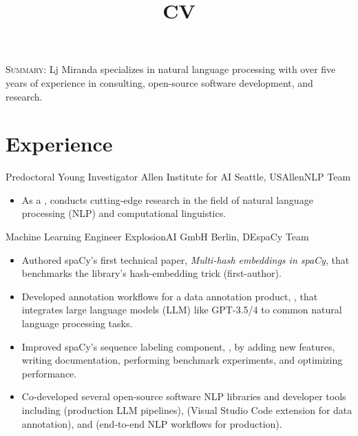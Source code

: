 \documentclass[12pt,a4paper]{moderncv}
\title{CV}
\begin{document}
\maketitle

\textsc{Summary}: Lj Miranda specializes in natural language processing with over five years of
experience in consulting, open-source software development, and research. 

\section{Experience}

{Predoctoral Young Investigator}
{Allen Institute for AI}
{Seattle, US}{AllenNLP Team}
{
    \begin{itemize}
        \item As a {\color{blue}}, conducts
        cutting-edge research in the field of natural language processing (NLP) and computational linguistics.
    \end{itemize}
}
\vspace{0.5em}

{Machine Learning Engineer}
{ExplosionAI GmbH}
{Berlin, DE}{spaCy Team}
{
    \begin{itemize}
        \item Authored spaCy's first technical paper, \textit{Multi-hash
        embeddings in spaCy}, that benchmarks the library's hash-embedding trick
        (first-author).
        \item Developed annotation workflows for a data annotation product,
        {\color{blue}}, that integrates large
        language models (LLM) like GPT-3.5/4 to common natural language processing tasks.
        \item Improved spaCy's sequence labeling component,
        {\color{blue}}, by
        adding new features, writing documentation, performing benchmark
        experiments, and optimizing performance.
        \item Co-developed several open-source software NLP libraries and
        developer tools including 
        {\color{blue}}
        (production LLM pipelines),
        {\color{blue}}
        (Visual Studio Code extension for data annotation), and
        {\color{blue}}
        (end-to-end NLP workflows for production).
    \end{itemize}
}
\vspace{0.5em}
\end{document}
